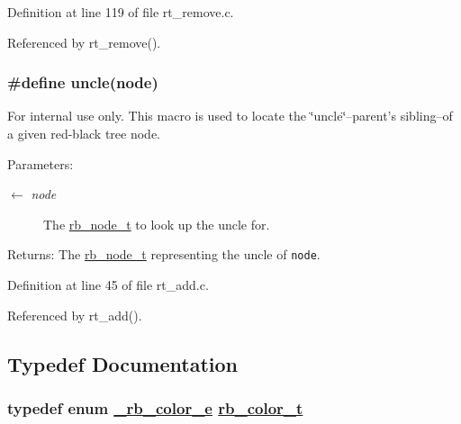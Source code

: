 Definition at line 119 of file rt\_\-remove.c.

Referenced by rt\_\-remove().\hypertarget{group__dbprim__rbtree_ga44}{
\subsubsection[uncle]{\setlength{\rightskip}{0pt plus 5cm}\#define uncle(node)}}
\label{group__dbprim__rbtree_ga44}


\begin{Desc}
\item[For internal use only.]
This macro is used to locate the \char`\"{}uncle\char`\"{}--parent's sibling--of a given red-black tree node.

\begin{Desc}
\item[Parameters:]
\begin{description}
\item[\mbox{$\leftarrow$} {\em node}]The \hyperlink{group__dbprim__rbtree_ga1}{rb\_\-node\_\-t} to look up the uncle for.\end{description}
\end{Desc}
\begin{Desc}
\item[Returns:]The \hyperlink{group__dbprim__rbtree_ga1}{rb\_\-node\_\-t} representing the uncle of {\tt node}.\end{Desc}
\end{Desc}


Definition at line 45 of file rt\_\-add.c.

Referenced by rt\_\-add().

\subsection{Typedef Documentation}
\hypertarget{group__dbprim__rbtree_ga4}{
\subsubsection[rb\_\-color\_\-t]{\setlength{\rightskip}{0pt plus 5cm}typedef enum \hyperlink{group__dbprim__rbtree_ga53}{\_\-rb\_\-color\_\-e} \hyperlink{group__dbprim__rbtree_ga4}{rb\_\-color\_\-t}}}
\label{group__dbprim__rbtree_ga4}


